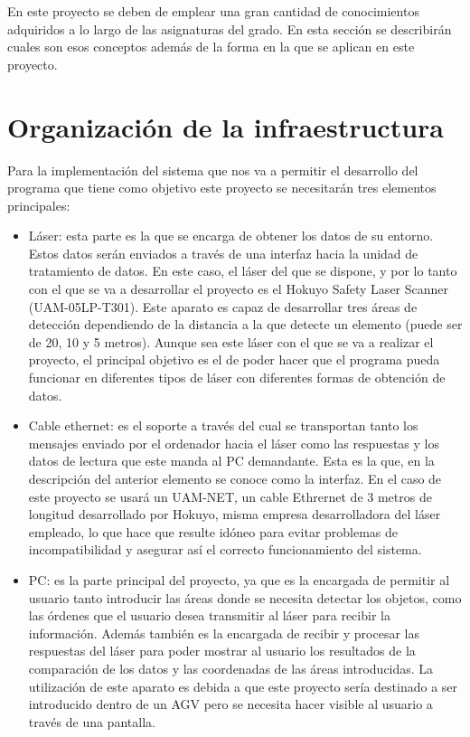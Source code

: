 \textit{}

En este proyecto se deben de emplear una gran cantidad de  conocimientos adquiridos a lo largo de las asignaturas del grado. En esta sección se describirán cuales son esos conceptos además de la forma en la que se aplican en este proyecto.

\section{Organización de la infraestructura}

Para la implementación del sistema que nos va a permitir el desarrollo del programa que tiene como objetivo este proyecto se necesitarán tres elementos principales:
\begin{itemize}
	 \item Láser: esta parte es la que se encarga de obtener los datos de su entorno. Estos datos serán enviados a través de una interfaz hacia la unidad de tratamiento de datos. En este caso, el láser del que se dispone, y por lo tanto con el que se va a desarrollar el proyecto es el Hokuyo Safety Laser Scanner (UAM-05LP-T301). Este aparato es capaz de desarrollar tres áreas de detección dependiendo de la distancia a la que detecte un elemento (puede ser de 20, 10 y 5 metros). Aunque sea este láser con el que se va a realizar el proyecto, el principal objetivo es el de poder hacer que el programa pueda funcionar en diferentes tipos de láser con diferentes formas de obtención de datos.\\
    \item Cable ethernet: es el soporte a través del cual se transportan tanto los mensajes enviado por el ordenador hacia el láser como las respuestas y los datos de lectura que este manda al PC demandante. Esta es la que, en la descripción del anterior elemento se conoce como la interfaz. En el caso de este proyecto se usará un UAM-NET, un cable Ethrernet de 3 metros de longitud desarrollado por Hokuyo, misma empresa desarrolladora del láser empleado, lo que hace que resulte idóneo para evitar problemas de incompatibilidad y asegurar así el correcto funcionamiento del sistema.
    \item PC: es la parte principal del proyecto, ya que es la encargada de permitir al usuario tanto introducir las áreas donde se necesita detectar los objetos, como las órdenes que el usuario desea transmitir al láser para recibir la información. Además también es la encargada de recibir y procesar las respuestas del láser para poder mostrar al usuario los resultados de la comparación de los datos y las coordenadas de las áreas introducidas. La utilización de este aparato es debida a que este proyecto sería destinado a ser introducido dentro de un AGV pero se necesita hacer visible al usuario a través de una pantalla.\\ 
\end{itemize}

